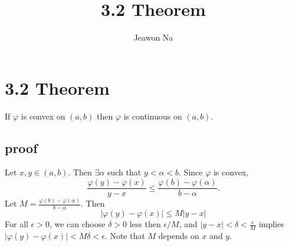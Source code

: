\documentclass[11pt,reqno]{article}
\renewcommand{\(}{\left(}
\renewcommand{\)}{\right)}
\renewcommand{\[}{\left[}
\renewcommand{\]}{\right]}
\newcommand{\ep}{\epsilon}
\newcommand{\gap}{\vspace{5em}}
\begin{document}
\title{3.2 Theorem}
\author{Jeawon Na}
\date{}

\maketitle

\section{3.2 Theorem}

If $\varphi$ is convex on $(a, b)$ then $\varphi$ is continuous on $(a, b)$.

\gap

\subsection{proof}

Let $x, y \in (a, b)$. Then $\exists \alpha$ such that $y < \alpha < b$.
Since $\varphi$ is convex, 
\begin{equation}
  \frac{\varphi (y) - \varphi (x)}{y-x} \le \frac{\varphi (b) - \varphi(\alpha)}{b-\alpha}.
\end{equation}
Let $M = \frac{\varphi (b) - \varphi(\alpha)}{b-\alpha}$. Then
\begin{equation}
  |\varphi (y) - \varphi (x)| \le M | y - x |
\end{equation}
For all $\ep > 0$, we can choose $\delta > 0$ less then $\ep / M$, and 
$|y - x| < \delta < \frac{\ep}{M}$ implies $|\varphi(y) - \varphi(x)|<M \delta < \ep$.
Note that $M$ depends on $x$ and $y$.
\end{document}

